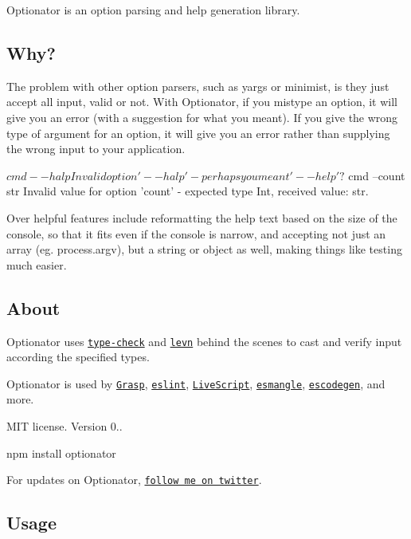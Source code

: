 \label{_optionator}%


Optionator is an option parsing and help generation library.

\subsection*{Why?}

The problem with other option parsers, such as {\ttfamily yargs} or {\ttfamily minimist}, is they just accept all input, valid or not. With Optionator, if you mistype an option, it will give you an error (with a suggestion for what you meant). If you give the wrong type of argument for an option, it will give you an error rather than supplying the wrong input to your application. \begin{DoxyVerb}$ cmd --halp
Invalid option '--halp' - perhaps you meant '--help'?

$ cmd --count str
Invalid value for option 'count' - expected type Int, received value: str.
\end{DoxyVerb}


Over helpful features include reformatting the help text based on the size of the console, so that it fits even if the console is narrow, and accepting not just an array (eg. process.\+argv), but a string or object as well, making things like testing much easier.

\subsection*{About}

Optionator uses \href{https://github.com/gkz/type-check}{\tt type-\/check} and \href{https://github.com/gkz/levn}{\tt levn} behind the scenes to cast and verify input according the specified types.

Optionator is used by \href{http://graspjs.com}{\tt Grasp}, \href{http://eslint.org}{\tt eslint}, \href{http://livescript.net}{\tt Live\+Script}, \href{https://github.com/estools/esmangle}{\tt esmangle}, \href{https://github.com/estools/escodegen}{\tt escodegen}, and more.

M\+I\+T license. Version 0.. \begin{DoxyVerb}npm install optionator
\end{DoxyVerb}


For updates on Optionator, \href{https://twitter.com/gkzahariev}{\tt follow me on twitter}.

\subsection*{Usage}

